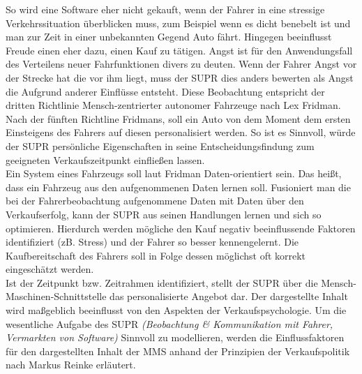 So wird eine Software eher nicht gekauft, wenn der Fahrer in eine stressige Verkehrssituation überblicken muss, zum Beispiel wenn es dicht benebelt ist und man zur Zeit in einer unbekannten Gegend Auto fährt. Hingegen beeinflusst Freude einen eher dazu, einen Kauf zu tätigen. Angst ist für den Anwendungsfall des Verteilens neuer Fahrfunktionen divers zu deuten. Wenn der Fahrer Angst vor der Strecke hat die vor ihm liegt, muss der SUPR dies anders bewerten als Angst die Aufgrund anderer Einflüsse entsteht. Diese Beobachtung entspricht der dritten Richtlinie Mensch-zentrierter autonomer Fahrzeuge nach Lex Fridman. \cite[S. 3]{b5} Nach der fünften Richtline Fridmans, soll ein Auto von dem Moment dem ersten Einsteigens des Fahrers auf diesen personalisiert werden.\cite[S. 5]{b5} So ist es Sinnvoll, würde der SUPR persönliche Eigenschaften in seine Entscheidungsfindung zum geeigneten Verkaufszeitpunkt einfließen lassen. \\

Ein System eines Fahrzeugs soll laut Fridman Daten-orientiert sein\cite[S. 3]{b5}. Das heißt, dass ein Fahrzeug aus den aufgenommenen Daten lernen soll. Fusioniert man die bei der Fahrerbeobachtung aufgenommene Daten mit Daten über den Verkaufserfolg, kann der SUPR aus seinen Handlungen lernen und sich so optimieren. Hierdurch werden mögliche den Kauf negativ beeinflussende Faktoren identifiziert (zB. Stress) und der Fahrer so besser kennengelernt. Die Kaufbereitschaft des Fahrers soll in Folge dessen möglichst oft korrekt eingeschätzt werden.\\

Ist der Zeitpunkt bzw. Zeitrahmen identifiziert, stellt der SUPR über die Mensch-Maschinen-Schnittstelle das personalisierte Angebot dar. Der dargestellte Inhalt wird maßgeblich beeinflusst von den Aspekten der Verkaufspsychologie. Um die wesentliche Aufgabe des SUPR \textit{(Beobachtung \& Kommunikation mit Fahrer, Vermarkten von Software)} Sinnvoll zu modellieren, werden die Einflussfaktoren für den dargestellten Inhalt der MMS anhand der Prinzipien der Verkaufspolitik nach Markus Reinke \cite{vkPsy} erläutert.\\

